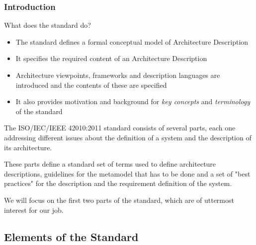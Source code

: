 		\begin{frame}
		\frametitle{Introduction}	
			\begin{block}{What does the standard do?}
			\vspace{0.3cm}
				\begin{itemize}\vspace{0.3cm}
					\item The standard defines a formal conceptual model of Architecture Description\vspace{0.3cm}
					\item It specifies the required content of an Architecture Description\vspace{0.3cm}
					\item Architecture viewpoints, frameworks and description languages are introduced and the contents of these are specified\vspace{0.3cm}
					\item It also provides motivation and background for \emph{key concepts} and \emph{terminology} of the standard\vspace{0.3cm}
				\end{itemize}			
			\end{block}
		\end{frame}
		
		\begin{frame}
		\vspace{0.3cm}
			The ISO/IEC/IEEE 42010:2011 standard consists of several parts, each one addressing different issues about the definition of a system and the description of its architecture.
			\newline\newline
			
			These parts define a standard set of terms used to define architecture descriptions, guidelines for the metamodel that has to be done and a set of "best practices" for the description and the requirement definition of the system.
			\newline\newline
			
		We will focus on the first two parts of the standard, which are of uttermost interest for our job.
		
		\end{frame}
		
		\subsection{Elements of the Standard}
		
